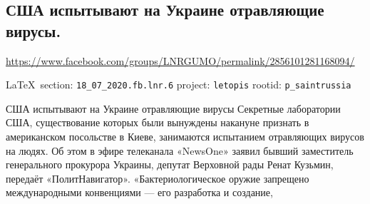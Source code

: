  
 
  
\subsection{США испытывают на Украине отравляющие вирусы.}
\url{https://www.facebook.com/groups/LNRGUMO/permalink/2856101281168094/}

\vspace{0.5cm}
{\small\LaTeX~section: \verb|18_07_2020.fb.lnr.6| project: \verb|letopis| rootid: \verb|p_saintrussia|}
\vspace{0.5cm}

США испытывают на Украине отравляющие вирусы Секретные лаборатории США,
существование которых были вынуждены накануне признать в американском
посольстве в Киеве, занимаются испытанием отравляющих вирусов на людях. Об этом
в эфире телеканала «NewsOne» заявил бывший заместитель генерального прокурора
Украины, депутат Верховной рады Ренат Кузьмин, передаёт «ПолитНавигатор».
«Бактериологическое оружие запрещено международными конвенциями --- его
разработка и создание, 
